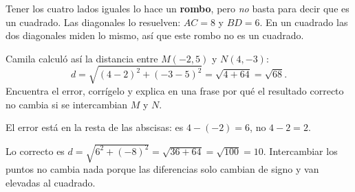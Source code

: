\documentclass[11pt]{article}
\begin{document}
\begin{preguntas}
\begin{solucion}[5cm]
Tener los cuatro lados iguales lo hace un \textbf{rombo}, pero \emph{no} basta para decir que
es un cuadrado. Las diagonales lo resuelven: $AC = 8$ y $BD = 6$. En un cuadrado las dos
diagonales miden lo mismo, así que este rombo no es un cuadrado.
\end{solucion}

\pregunta[1] Camila calculó así la distancia entre $M(-2, 5)$ y $N(4, -3)$:
\[ d = \sqrt{(4 - 2)^2 + (-3 - 5)^2} = \sqrt{4 + 64} = \sqrt{68}. \]
Encuentra el error, corrígelo y explica en una frase por qué el resultado correcto no cambia
si se intercambian $M$ y $N$.
\begin{solucion}[4cm]
El error está en la resta de las abscisas: es $4 - (-2) = 6$, no $4 - 2 = 2$.

Lo correcto es $d = \sqrt{6^2 + (-8)^2} = \sqrt{36 + 64} = \sqrt{100} = 10$. Intercambiar los
puntos no cambia nada porque las diferencias solo cambian de signo y van elevadas al cuadrado.
\end{solucion}

\end{preguntas}
\end{document}
